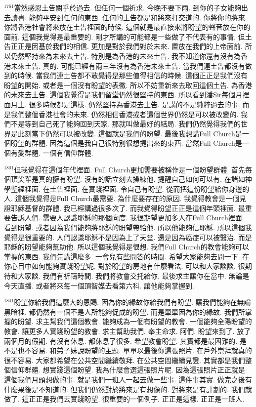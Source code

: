 \documentclass{book}
\begin{document}
$^{1761}$當然感恩土告關乎於過去.
但任何一個祈求.
今晚不要下雨.
到你的子女能夠出去讀書.
能夠平安到任何的東西.
任何的土告都是和將來打交道的.
你將你的將來.
你將香港社會將來放在土告裡面的時候.
這個就是最直接來將盼望的聲音放在你的面前.
這個我覺得是最重要的.
剛才所講的可能都是一些做了不代表有的事情.
但土告正正是因基於我們的相信.
更加是對於我們對於未來.
置放在我們的上帝面前.
所以仍然堅持來為未來去土告.
特別是為香港的未來土告.
我不知道你還有沒有為香港未來土告.
真的.
可能已經有兩三年沒有為香港未來土告.
當我們連土告都沒有做到的時候.
當我們連土告都不敢覺得是那些值得相信的時候.
這個正正是我們沒有盼望的開始.
或者是一個沒有盼望的表徵.
所以不妨重新來去取回這個土告.
為香港的未來去土告.
這個我覺得是我們留堂仍然很堅持的東西.
所以看到潘Sir每個月裡面月土.
很多時候都是這樣.
仍然堅持為香港去土告.
是講的不是純粹過去的事.
而是我們整個香港社會的未來.
仍然相信香港或者這個世界仍然是可以被改變的.
我們不是等到自己死了能夠回到天家.
那就叫做最好的結局.
我們仍然覺得我們的世界是此刻當下仍然可以被改變.
這個就是我們的盼望.
最後我想講Full Church是一個盼望的群體.
因為這個是我自己很特別很想提出來的東西.
當然Full Church是一個有愛群體.
一個有信仰群體.

$^{1801}$但我覺得在這個年代裡面.
Full Church更加需要被稱作是一個盼望群體.
首先每個頂尖輩是真的擁有盼望.
沒有的話立刻去操練他.
提醒自己如何可以有.
在諸如神學聖經裡面.
在土告裡面.
在實踐裡面.
令自己有盼望.
從而把這份盼望給你身邊的人.
這個我覺得是Full Church最需要.
為什麼要存在的原因.
我覺得教會是一個見證耶穌基督的群體.
我已經講過很多次了.
而我覺得盼望正正是這個年頭裡面.
最重要告訴人們.
需要人認識耶穌的那個向度.
我很期望更加多人在Full Church裡面.
看到盼望.
或者因為我們能夠將耶穌的盼望帶給他.
所以他能夠信耶穌.
所以這個我覺得是很重要的.
人們認識耶穌不是因為上了天堂.
還是因為癌症可以被醫治.
而是耶穌的盼望能夠幫助他.
所以這個我覺得是很想.
我們Full Church的教會能夠可以掌握的東西.
我們先講這麼多.
一會兒有些問答的時間.
希望大家能夠去問一下.
在你心目中如何能夠實踐盼望呢.
對於盼望的房地有什麼看法.
可以和大家談談.
很期待和大家談.
我們有祈禱時間.
我們將教會交托給你.
最後求主讓你在當中.
無論是今天直播.
或者將來每一個頂智媒去看第六科.
讓他能夠掌握到.

$^{1841}$盼望你給我們這麼大的恩賜.
因為你的緣故你給我們有盼望.
讓我們能夠在無論黑暗裡.
都仍然有一個不是人所能夠促成的盼望.
而是單單因為你的緣故.
我們所掌握的盼望.
求主幫我們這個教會.
能夠成為一個有盼望的教會.
一個能夠全陽盼望的教會.
讓更多人實踐盼望的教會.
求主幫助我們.
奉主命求.
阿們.
盼望來到了.
放了兩個月的假期.
有沒有休息.
都休息了很多.
希望教會盼望.
其實都是最困難的.
是不是也不容易.
和弟子妹說盼望的主題.
單單以最後你這張照片.
在戶外崇拜就真的很不容易.
大家都希望在公共空間繼續敬拜.
在公共空間繼續見證.
其實都是我們整個信仰群體.
想實踐這個盼望.
我為什麼會選這張照片呢.
因為這張照片正正就是.
這個我們月頭想做的事.
就是我們一班人一起去做一些事.
這件事其實.
做完之後有什麼果後是不知道的.
但我們仍然對於將來是有想像的.
對將來是有計劃的.
我們就做了.
這正正是我們去實踐盼望.
很重要的一個例子.
正正是這樣.
正正是一班人.
\end{document}
